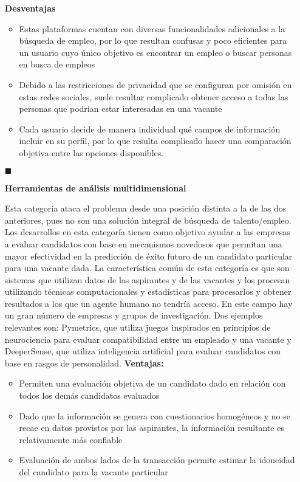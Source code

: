 \begin{itemize}
  \textbf{Desventajas}
  \begin{itemize}
    \item Estas plataformas cuentan con diversas funcionalidades adicionales a la búsqueda de empleo, por lo que resultan confusas y poco eficientes para un usuario cuyo único objetivo es encontrar un empleo o buscar personas en busca de empleos
    \item  Debido a las restricciones de privacidad que se configuran por omisión en estas redes sociales, suele resultar complicado obtener acceso a todas las personas que podrían estar interesadas en una vacante
    \item Cada usuario decide de manera individual qué campos de información incluir en su perfil, por lo que resulta complicado hacer una comparación objetiva entre las opciones disponibles.
  \end{itemize}




    \item[$\blacksquare$] 
    \begin{flushleft}
    \textbf{Herramientas de análisis multidimensional}
    \end{flushleft}
    \linebreak
  Esta categoría ataca el problema desde una posición distinta a la de las dos anteriores, pues no son una solución integral de búsqueda de talento/empleo. Los desarrollos en esta categoría tienen como objetivo ayudar a las empresas a evaluar candidatos con base en mecanismos novedosos que permitan una mayor efectividad en la predicción de éxito futuro de un candidato particular para una vacante dada. La característica común de esta categoría es que son sistemas que utilizan datos de las aspirantes y de las vacantes y los procesan utilizando técnicas computacionales y estadísticas para procesarlos y obtener resultados a los que un agente humano no tendría acceso. En este campo hay un gran número de empresas y grupos de investigación.
  Dos ejemplos relevantes son: Pymetrics, que utiliza juegos inspirados en principios de neurociencia para evaluar compatibilidad entre un empleado y una vacante y DeeperSense, que utiliza inteligencia artificial para evaluar candidatos con base en rasgos de personalidad.
  \linebreak
  \linebreak
  \textbf{Ventajas:} 
  \begin{itemize}
    \item  Permiten una evaluación objetiva de un candidato dado en relación con todos los demás candidatos evaluados
    \item  Dado que la información se genera con cuestionarios homogéneos y no se recae en datos provistos por las aspirantes, la información resultante es relativamente más confiable
    \item Evaluación de ambos lados de la transacción permite estimar la idoneidad del candidato para la vacante particular
  \end{itemize}



\end{itemize}
